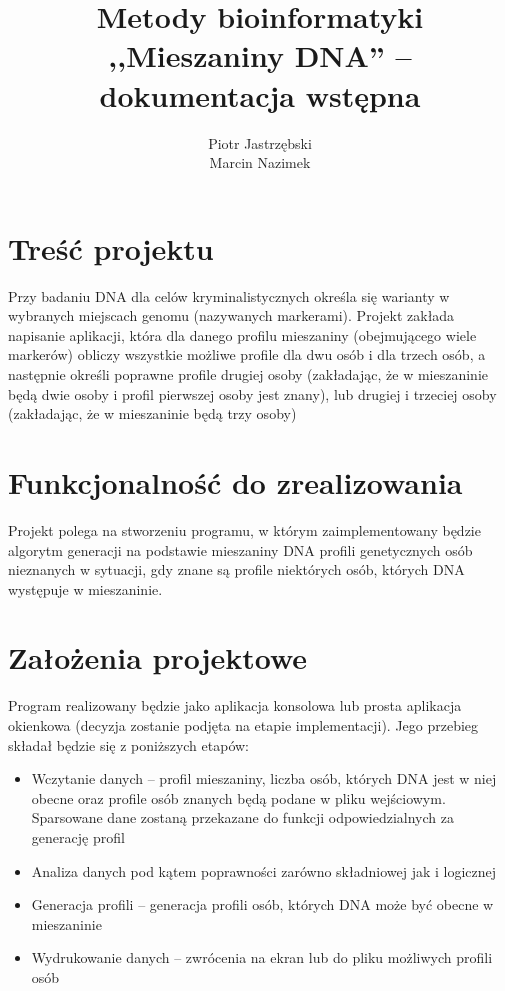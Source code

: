 \documentclass[11pt,a4paper]{article}
\title{Metody bioinformatyki\\ ,,Mieszaniny DNA'' -- dokumentacja wstępna}
\author{Piotr Jastrzębski\\ Marcin Nazimek}
\date{}
\begin{document}
\maketitle


\section{Treść projektu}
Przy badaniu DNA dla celów kryminalistycznych określa się warianty w wybranych miejscach genomu (nazywanych markerami). Projekt zakłada napisanie aplikacji, która dla danego profilu mieszaniny (obejmującego wiele markerów) obliczy wszystkie możliwe profile dla dwu osób i dla trzech osób, a następnie określi poprawne profile drugiej osoby (zakładając, że w mieszaninie będą dwie osoby i profil pierwszej osoby jest znany), lub drugiej i trzeciej osoby (zakładając, że w mieszaninie będą trzy osoby)

\section{Funkcjonalność do zrealizowania}
Projekt polega na stworzeniu programu, w którym zaimplementowany będzie algorytm generacji na podstawie mieszaniny DNA profili genetycznych osób nieznanych w sytuacji, gdy znane są profile niektórych osób, których DNA występuje w mieszaninie.

\section{Założenia projektowe}
Program realizowany będzie jako aplikacja konsolowa lub prosta aplikacja okienkowa (decyzja zostanie podjęta na etapie implementacji). Jego przebieg składał będzie się z poniższych etapów:
\begin{itemize}
\item Wczytanie danych -- profil mieszaniny, liczba osób, których DNA jest w niej obecne oraz profile osób znanych będą podane w pliku wejściowym. Sparsowane dane zostaną przekazane do funkcji odpowiedzialnych za generację profil
\item Analiza danych pod kątem poprawności zarówno składniowej jak i logicznej
\item Generacja profili -- generacja profili osób, których DNA może być obecne w mieszaninie
\item Wydrukowanie danych -- zwrócenia na ekran lub do pliku możliwych profili osób
\end{itemize}
\end{document}
